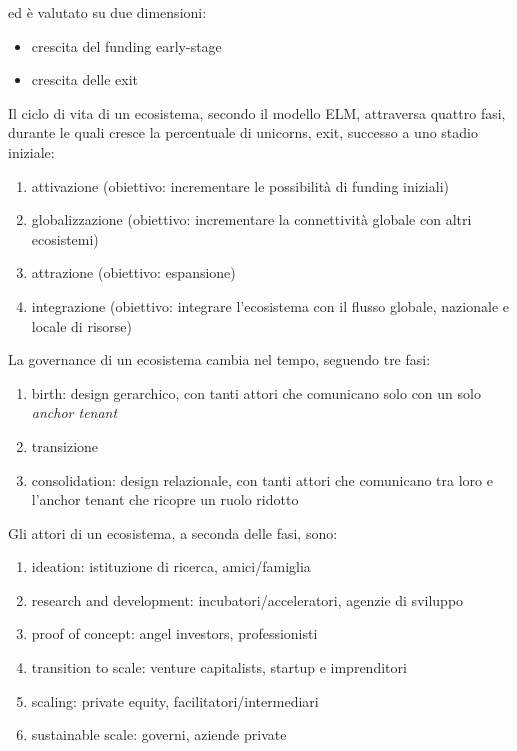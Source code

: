 \documentclass[answers, a4paper, 11pt]{exam}
\begin{document}
ed è valutato su due dimensioni:

\begin{itemize}
    \item crescita del funding early-stage
    \item crescita delle exit
\end{itemize}

Il ciclo di vita di un ecosistema, secondo il modello ELM, attraversa quattro fasi, durante le quali cresce la percentuale di unicorns, exit, successo a uno stadio iniziale:

\begin{enumerate}
    \item attivazione (obiettivo: incrementare le possibilità di funding iniziali)
    \item globalizzazione (obiettivo: incrementare la connettività globale con altri ecosistemi)
    \item attrazione (obiettivo: espansione)
    \item integrazione (obiettivo: integrare l'ecosistema con il flusso globale, nazionale e locale di risorse)
\end{enumerate}

La governance di un ecosistema cambia nel tempo, seguendo tre fasi:

\begin{enumerate}
    \item birth: design gerarchico, con tanti attori che comunicano solo con un solo \emph{anchor tenant}
    \item transizione
    \item consolidation: design relazionale, con tanti attori che comunicano tra loro e l'anchor tenant che ricopre un ruolo ridotto
\end{enumerate}

Gli attori di un ecosistema, a seconda delle fasi, sono:

\begin{enumerate}
    \item ideation: istituzione di ricerca, amici/famiglia
    \item research and development: incubatori/acceleratori, agenzie di sviluppo
    \item proof of concept: angel investors, professionisti
    \item transition to scale: venture capitalists, startup e imprenditori
    \item scaling: private equity, facilitatori/intermediari
    \item sustainable scale: governi, aziende private
\end{enumerate}
\end{document}
